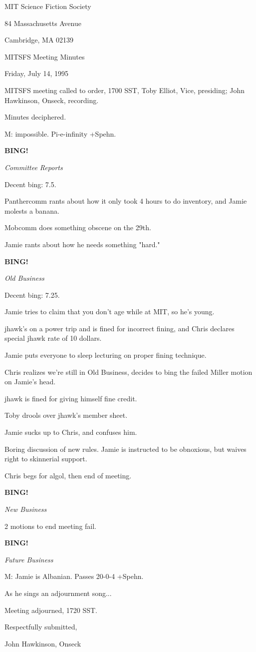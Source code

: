 \documentclass[12pt]{article}
\newcommand{\bing}{{\bf BING!} }
\newcommand{\goto}[1]{\bing \vskip 12pt \centerline{{\em{#1}}}}
\begin{document}
\begin{center}

MIT Science Fiction Society 

84 Massachusetts Avenue

Cambridge, MA 02139

\vspace{12pt}

MITSFS Meeting Minutes 

Friday, July 14, 1995

\end{center}
 
\vspace{18pt}

\setlength{\parskip}{6pt}

\noindent
MITSFS meeting called to order, 1700 SST,
Toby Elliot, Vice, presiding; John Hawkinson, Onseck, recording.

Minutes deciphered.

M: impossible. Pi-e-infinity +Spehn.

\goto{Committee Reports}

Decent bing: 7.5.

Panthercomm rants about how it only took 4 hours to do inventory, and Jamie molests a banana.

Mobcomm does something obscene on the 29th.

Jamie rants about how he needs something "hard."

\goto{Old Business}

Decent bing: 7.25.

Jamie tries to claim that you don't age while at MIT, so he's young.

jhawk's on a power trip and is fined for incorrect fining, and Chris declares special jhawk rate of 10 dollars.

Jamie puts everyone to sleep lecturing on proper fining technique.

Chris realizes we're still in Old Business, decides to bing the failed Miller motion on Jamie's head.

jhawk is fined for giving himself fine credit.

Toby drools over jhawk's member sheet.

Jamie sucks up to Chris, and confuses him.

Boring discussion of new rules. Jamie is instructed to be obnoxious, but waives right to skinnerial support.

Chris begs for algol, then end of meeting.

\goto{New Business}

2 motions to end meeting fail.

\goto{Future Business}

M: Jamie is Albanian. Passes 20-0-4 +Spehn.

As he sings an adjournment song...

\vspace{12pt}

\noindent
Meeting adjourned, 1720 SST.

\vspace{18pt}

\centerline{Respectfully submitted,}
\centerline{John Hawkinson, Onseck}
\end{document}

